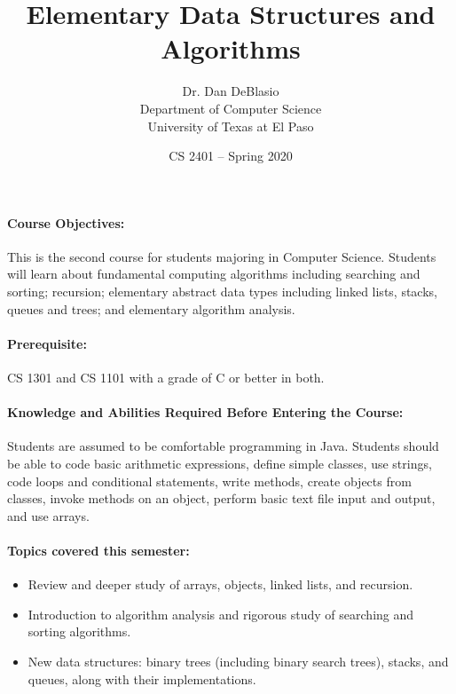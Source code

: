 \documentclass[12pt]{scrartcl}
\title{Elementary Data Structures and Algorithms}\let\Title\@title
\subtitle{
{\small
\vskip0.5cm
Dr. Dan DeBlasio\\
Department of Computer Science \\
University of Texas at El Paso}
\vskip-1cm}
\date{\small CS 2401 -- Spring 2020}
\begin{document}
\maketitle

\paragraph{Course Objectives:} This is the second course for students majoring in Computer Science. Students will learn about fundamental computing algorithms including searching and sorting; recursion; elementary abstract data types including linked lists, stacks, queues and trees; and elementary algorithm analysis. 

\paragraph{Prerequisite:} CS 1301 and CS 1101 with a grade of C or better in both. 

\paragraph{Knowledge and Abilities Required Before Entering the Course:} Students are assumed to be comfortable programming in Java. Students should be able to code basic arithmetic expressions, define simple classes, use strings, code loops and conditional statements, write methods, create objects from classes, invoke methods on an object, perform basic text file input and output, and use arrays.

\paragraph{Topics covered this semester:}
\begin{itemize} 
\item Review and deeper study of arrays, objects, linked lists, and recursion. 
\item Introduction to algorithm analysis and rigorous study of searching and sorting algorithms. 
\item New data structures: binary trees (including binary search trees), stacks, and queues, along with their implementations. 
\end{itemize}
\end{document}
